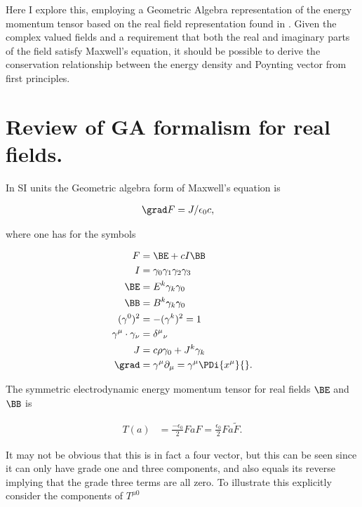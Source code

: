 Here I explore this, employing a Geometric Algebra representation of the energy momentum tensor based on the real field representation found in \cite{doran2003gap}.  Given the complex valued fields and a requirement that both the real and imaginary parts of the field satisfy Maxwell's equation, it should be possible to derive the conservation relationship between the energy density and Poynting vector from first principles.

\section{Review of GA formalism for real fields.}

In SI units the Geometric algebra form of Maxwell's equation is

\label{eqn:complexFieldEnergy:4}
\begin{align}
\grad F &= J/\epsilon_0 c,
\end{align}

where one has for the symbols

\begin{subequations}
\begin{align}
\label{eqn:complexFieldEnergy:5}
F &= \BE + c I \BB \\
I &= \gamma_0 \gamma_1 \gamma_2 \gamma_3 \\
\BE &= E^k \gamma_k \gamma_0  \\
\BB &= B^k \gamma_k \gamma_0  \\
(\gamma^0)^2 &= -(\gamma^k)^2 = 1 \\
\gamma^\mu \cdot \gamma_\nu &= {\delta^\mu}_\nu \\
J &= c \rho \gamma_0 + J^k \gamma_k \\
\grad &= \gamma^\mu \partial_\mu = \gamma^\mu \PDi{x^\mu}{}.
\end{align}
\end{subequations}

The symmetric electrodynamic energy momentum tensor for real fields $\BE$ and $\BB$ is

\begin{align}\label{eqn:complexFieldEnergy:6}
T(a) &= \frac{-\epsilon_0}{2} F a F = \frac{\epsilon_0}{2} F a \tilde{F}.
\end{align}

It may not be obvious that this is in fact a four vector, but this can be seen since it can only have grade one and three components, and also equals its reverse implying that the grade three terms are all zero.  To illustrate this explicitly consider the components of $T^{\mu 0}$

